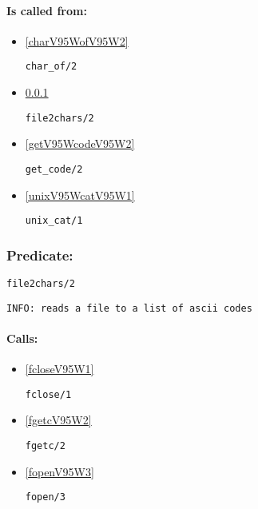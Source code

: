 \paragraph{Is called from:} 
\begin{itemize}
\item \ref{charV95WofV95W2} 
\begin{verbatim}
char_of/2
\end{verbatim}

\item \ref{file2charsV95W2} 
\begin{verbatim}
file2chars/2
\end{verbatim}

\item \ref{getV95WcodeV95W2} 
\begin{verbatim}
get_code/2
\end{verbatim}

\item \ref{unixV95WcatV95W1} 
\begin{verbatim}
unix_cat/1
\end{verbatim}

\end{itemize}

\subsubsection{Predicate:} \label{file2charsV95W2}

\begin{verbatim}
file2chars/2
\end{verbatim}

{\small \begin{verbatim}
INFO: reads a file to a list of ascii codes

\end{verbatim}}
\paragraph{Calls:} 
\begin{itemize}
\item \ref{fcloseV95W1} 
\begin{verbatim}
fclose/1
\end{verbatim}

\item \ref{fgetcV95W2} 
\begin{verbatim}
fgetc/2
\end{verbatim}

\item \ref{fopenV95W3} 
\begin{verbatim}
fopen/3
\end{verbatim}

\end{itemize}

